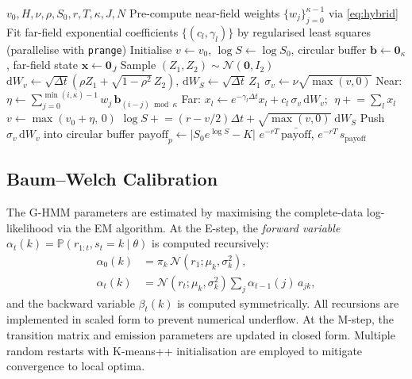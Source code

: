 \documentclass[conference]{IEEEtran}
\newcommand{\Prob}{\mathbb{P}}
\newcommand{\N}{\mathcal{N}}
\newcommand{\dd}{\mathrm{d}}
\newcommand{\abs}[1]{\lvert #1 \rvert}
\begin{document}
\begin{algorithm}[h]
\caption{Hybrid Scheme Monte Carlo Straddle Pricer}\label{alg:mc}
\begin{algorithmic}[1]
  \Require $v_0, H, \nu, \rho, S_0, r, T, \kappa, J, N$
  \State Pre-compute near-field weights $\{w_j\}_{j=0}^{\kappa-1}$
         via \eqref{eq:hybrid}
  \State Fit far-field exponential coefficients $\{(c_l,\gamma_l)\}$
         by regularised least squares
   \hfill (parallelise with \texttt{prange})
    \State Initialise $v \leftarrow v_0$, $\log S \leftarrow \log S_0$,
           circular buffer $\mathbf{b} \leftarrow \mathbf{0}_\kappa$,
           far-field state $\mathbf{x} \leftarrow \mathbf{0}_J$
      \State Sample $(Z_1, Z_2) \sim \N(\mathbf{0}, I_2)$
      \State $\dd W_v \leftarrow \sqrt{\Delta t}(\rho Z_1
             + \sqrt{1-\rho^2}\,Z_2)$,
             $\dd W_S \leftarrow \sqrt{\Delta t}\,Z_1$
      \State $\sigma_v \leftarrow \nu\sqrt{\max(v,0)}$
      \State Near: $\eta \leftarrow \sum_{j=0}^{\min(i,\kappa)-1}
             w_j\,\mathbf{b}_{(i-j)\bmod\kappa}$
      \State Far: $x_l \leftarrow e^{-\gamma_l\Delta t}x_l
             + c_l\,\sigma_v\,\dd W_v$; $\;\eta \mathrel{+}=
             \sum_l x_l$
      \State $v \leftarrow \max(v_0 + \eta,\, 0)$
      \State $\log S \mathrel{+}= (r - v/2)\Delta t
             + \sqrt{\max(v,0)}\;\dd W_S$
      \State Push $\sigma_v\,\dd W_v$ into circular buffer
    \EndFor
    \State $\text{payoff}_p \leftarrow \abs{S_0 e^{\log S} - K}$
  \EndFor
  \State \Return $e^{-rT}\,\bar{\text{payoff}}$, $e^{-rT}\,s_{\text{payoff}}$
\end{algorithmic}
\end{algorithm}

\subsection{Baum--Welch Calibration}

The G-HMM parameters are estimated by maximising the complete-data
log-likelihood via the EM algorithm.  At the E-step, the
\emph{forward variable} $\alpha_t(k) = \Prob(r_{1:t}, s_t=k\mid\theta)$
is computed recursively:
\begin{align}
  \alpha_0(k) &= \pi_k\,\N(r_1;\mu_k,\sigma_k^2), \nonumber\\
  \alpha_t(k) &= \N(r_t;\mu_k,\sigma_k^2)
                \sum_{j} \alpha_{t-1}(j)\,a_{jk}, \label{eq:forward}
\end{align}
and the backward variable $\beta_t(k)$ is computed symmetrically.
All recursions are implemented in scaled form to prevent numerical
underflow.  At the M-step, the transition matrix and emission
parameters are updated in closed form.  Multiple random restarts with
K-means++ initialisation are employed to mitigate convergence to
local optima.
\end{document}
